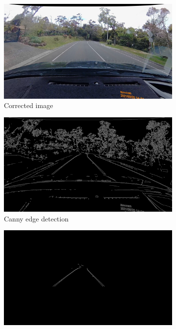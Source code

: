 \documentclass[11pt,twoside]{report}
\begin{document}
\begin{figure}[h]
\centering
\begin{subfigure}{0.3\textwidth}
	\includegraphics[width=\textwidth]{f008_corrected.png}
	\caption{Corrected image}
\end{subfigure}
\hfill
\begin{subfigure}{0.3\textwidth}
	\includegraphics[width=\textwidth]{f009_canny.png}
	\caption{Canny edge detection}
\end{subfigure}
\hfill
\begin{subfigure}{0.3\textwidth}
	\includegraphics[width=\textwidth]{f009_canny_cropped.png}

\end{subfigure}
\end{figure}
\end{document}

